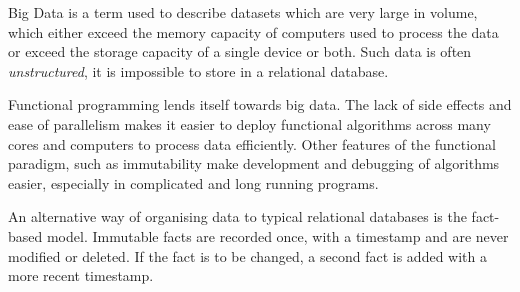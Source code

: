 \documentclass[10pt]{article}
\begin{document}
Big Data is a term used to describe datasets which are very large in volume, which either exceed the memory capacity of computers used to process the data or exceed the storage capacity of a single device or both. Such data is often \emph{unstructured}, it is impossible to store in a relational database.

Functional programming lends itself towards big data. The lack of side effects and ease of parallelism makes it easier to deploy functional algorithms across many cores and computers to process data efficiently. Other features of the functional paradigm, such as immutability make development and debugging of algorithms easier, especially in complicated and long running programs.

An alternative way of organising data to typical relational databases is the fact-based model. Immutable facts are recorded once, with a timestamp and are never modified or deleted. If the fact is to be changed, a second fact is added with a more recent timestamp.
\end{document}
